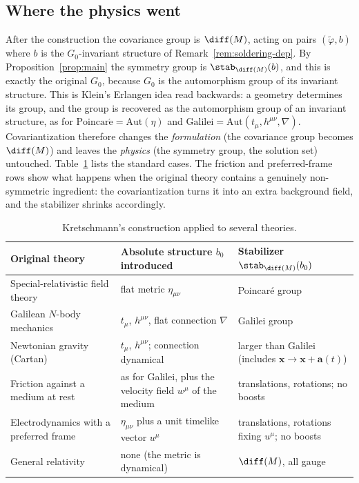 \subsection{Where the physics went}

After the construction the covariance group is $\diff(M)$, acting on pairs
$(\tilde\varphi,b)$ where $b$ is the $G_0$-invariant structure of
Remark~\ref{rem:soldering-dep}. By Proposition~\ref{prop:main} the symmetry
group is $\stab_{\diff(M)}(b)$, and this is exactly the original $G_0$, because
$G_0$ is the automorphism group of its invariant structure. This is Klein's
Erlangen idea read backwards: a geometry determines its group, and the group
is recovered as the automorphism group of an invariant structure, as for
$\mathrm{Poincar\acute e}=\mathrm{Aut}(\eta)$ and
$\text{Galilei}=\mathrm{Aut}(t_\mu,h^{\mu\nu},\nabla)$. Covariantization
therefore changes the \emph{formulation} (the covariance group becomes
$\diff(M)$) and leaves the \emph{physics} (the symmetry group, the solution
set) untouched. Table~\ref{tab:kretschmannize} lists the standard cases. The
friction and preferred-frame rows show what happens when the original theory
contains a genuinely non-symmetric ingredient: the covariantization turns it
into an extra background field, and the stabilizer shrinks accordingly.

\begin{table}[ht]
\centering
\small
\renewcommand{\arraystretch}{1.25}
\setlength{\tabcolsep}{4pt}
\begin{tabular}{@{}>{\raggedright\arraybackslash}p{3.7cm}%
                  >{\raggedright\arraybackslash}p{5.6cm}%
                  >{\raggedright\arraybackslash}p{5.0cm}@{}}
\toprule
Original theory & Absolute structure $b_0$ introduced & Stabilizer $\stab_{\diff(M)}(b_0)$\\
\midrule
Special-relativistic field theory & flat metric $\eta_{\mu\nu}$ & Poincar\'e group\\
Galilean $N$-body mechanics & $t_\mu$, $h^{\mu\nu}$, flat connection $\nabla$ & Galilei group\\
Newtonian gravity (Cartan) & $t_\mu$, $h^{\mu\nu}$; connection dynamical
  & larger than Galilei (includes ${\bm{x}}\to{\bm{x}}+\bm a(t)$)\\
Friction against a medium at rest & as for Galilei, plus the velocity field
  $w^\mu$ of the medium & translations, rotations; no boosts\\
Electrodynamics with a preferred frame & $\eta_{\mu\nu}$ plus a unit timelike
  vector $u^\mu$ & translations, rotations fixing $u^\mu$; no boosts\\
General relativity & none (the metric is dynamical) & $\diff(M)$, all gauge\\
\bottomrule
\end{tabular}
\caption{Kretschmann's construction applied to several theories.}
\label{tab:kretschmannize}
\end{table}

